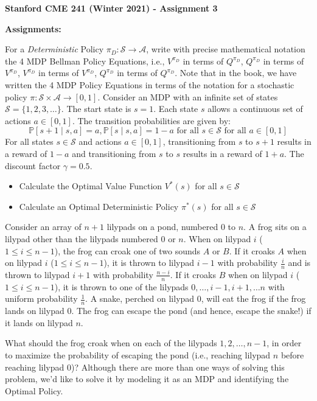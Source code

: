 \documentclass[12pt]{exam}
\begin{document}
\begin{center}
{\large {\bf Stanford CME 241 (Winter 2021) - Assignment 3}}
\end{center}
 
{\large{\bf Assignments:}}
\begin{questions}
\question For a {\em Deterministic} Policy $\pi_D: \mathcal{S} \rightarrow \mathcal{A}$,  write with precise mathematical notation the 4 MDP Bellman Policy Equations, i.e., $V^{\pi_D}$ in terms of $Q^{\pi_D}$, $Q^{\pi_D}$ in terms of $V^{\pi_D}$, $V^{\pi_D}$ in terms of $V^{\pi_D}$, $Q^{\pi_D}$ in terms of $Q^{\pi_D}$. Note that in the book, we have written the 4 MDP Policy Equations in terms of the notation for a stochastic policy $\pi: \mathcal{S} \times \mathcal{A} \rightarrow [0, 1]$.
\question Consider an MDP with an infinite set of states $\mathcal{S} = \{1,2,3,\ldots \}$. The start state is $s=1$. Each state $s$ allows a continuous set of actions $a \in [0,1]$. The transition probabilities are given by: $$\mathbb{P}[s+1 \mid s, a] = a, \mathbb{P}[s \mid s, a] = 1 - a \mbox{ for all } s \in \mathcal{S} \mbox{ for all } a \in [0,1]$$
 For all states $s \in \mathcal{S}$ and actions $a \in [0,1]$, transitioning from $s$ to $s+1$ results in a reward of $1-a$ and transitioning from $s$ to $s$ results in a reward of $1+a$. The discount factor $\gamma=0.5$.
\begin{itemize}
\item Calculate the Optimal Value Function $V^*(s)$ for all $s \in \mathcal{S}$
\item Calculate an Optimal Deterministic Policy $\pi^*(s)$ for all $s \in \mathcal{S}$
\end{itemize}
\question Consider an array of $n+1$ lilypads on a pond, numbered $0$ to $n$. A frog sits on a lilypad other than the lilypads numbered $0$ or $n$.  When on lilypad $i$ ($1\leq i \leq n-1$), the frog can croak one of two sounds $A$ or $B$. If it croaks $A$ when on lilypad $i$ ($1 \leq i \leq n-1$), it is thrown to lilypad $i-1$ with probability $\frac i n$ and is thrown to lilypad $i+1$ with probability $\frac {n-i} n$. If it croaks $B$ when on lilypad $i$ ($1\leq i \leq n-1$), it is thrown to one of the lilypads $0, \ldots, i-1, i+1, \ldots n$ with uniform probability $\frac 1 n$. A snake, perched on lilypad $0$, will eat the frog if the frog lands on lilypad $0$. The frog can escape the pond (and hence, escape the snake!) if it lands on lilypad $n$.

What should the frog croak when on each of the lilypads $1, 2, \ldots, n-1$, in order to maximize the probability of escaping the pond (i.e., reaching lilypad $n$ before reaching lilypad $0$)? Although there are more than one ways of solving this problem, we'd like to solve it by modeling it as an MDP and identifying the Optimal Policy.


\end{questions}
\end{document}
